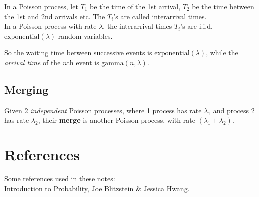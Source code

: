 \documentclass{article}
\begin{document}
\begin{definition}
    In a Poisson process, let $T_{1}$ be the time of the 1st arrival, $T_{2}$ be the time between the 1st and 2nd arrivals etc. The $T_i$'s are called interarrival times. \\ 
    \noindent In a Poisson process with rate $\lambda$, the interarrival times $T_i$'s are i.i.d. $\text{exponential}(\lambda)$ random variables. 
\end{definition} So the waiting time between successive events is $\text{exponential}(\lambda)$, while the \textit{arrival time} of the $n$th event is $\text{gamma}(n, \lambda)$. 

\subsection{Merging}
\begin{definition}
    Given 2 \textit{independent} Poisson processes, where 1 process has rate $\lambda_1$ and process 2 has rate $\lambda_2$, their \textbf{merge} is another Poisson process, with rate $(\lambda_1 + \lambda_2)$. 
\end{definition}

















\newpage 

\section*{References}

Some references used in these notes: \\ 

Introduction to Probability, Joe Blitzstein \& Jessica Hwang. 
\end{document}
